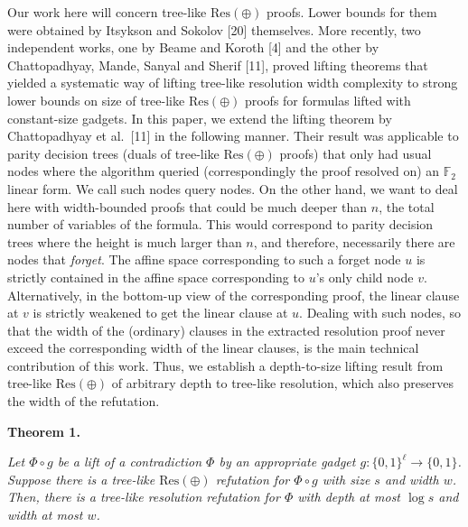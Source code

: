 \documentclass[10pt,a4paper]{article}
\begin{document}
Our work here will concern tree-like $\text{Res}(\oplus)$ proofs. Lower bounds for them were obtained by Itsykson and Sokolov [20] themselves. More recently, two independent works, one by Beame and Koroth [4] and the other by Chattopadhyay, Mande, Sanyal and Sherif [11], proved lifting theorems that yielded a systematic way of lifting tree-like resolution width complexity to strong lower bounds on size of tree-like $\text{Res}(\oplus)$ proofs for formulas lifted with constant-size gadgets.
In this paper, we extend the lifting theorem by Chattopadhyay et al. [11] in the following manner. Their result was applicable to parity decision trees (duals of tree-like $\text{Res}(\oplus)$ proofs) that only had usual nodes where the algorithm queried (correspondingly the proof resolved on) an $\mathbb{F}_{2}$ linear form. We call such nodes query nodes. On the other hand, we want to deal here with width-bounded proofs that could be much deeper than $n$, the total number of variables of the formula. This would correspond to parity decision trees where the height is much larger than $n$, and therefore, necessarily there are nodes that \emph{forget}. The affine space corresponding to such a forget node $u$ is strictly contained in the affine space corresponding to $u$’s only child node $v$. Alternatively, in the bottom-up view of the corresponding proof, the linear clause at $v$ is strictly weakened to get the linear clause at $u$. Dealing with such nodes, so that the width of the (ordinary) clauses in the extracted resolution proof never exceed the corresponding width of the linear clauses, is the main technical contribution of this work.
Thus, we establish a depth-to-size lifting result from tree-like $\text{Res}(\oplus)$ of arbitrary depth to tree-like resolution, which also preserves the width of the refutation.\par





\par\medskip\noindent\textbf{
\textbf{Theorem 1}\textbf{.}
}\par



\emph{Let $\Phi\circ g$ be a lift of a contradiction $\Phi$ by an appropriate gadget $g:\{0,1\}^{\ell}\to\{0,1\}$.
Suppose there is a tree-like $\text{Res}(\oplus)$ refutation for $\Phi\circ g$ with size $s$ and width $w$.
Then, there is a tree-like resolution refutation for $\Phi$ with depth at most $\log s$ and width at most $w$.}\par
\end{document}
